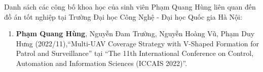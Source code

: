 Danh sách các công bố khoa học của sinh viên Phạm Quang Hùng liên quan đến đồ án tốt nghiệp tại Trường Đại học Công Nghệ - Đại học Quốc gia Hà Nội:
\begin{enumerate}
    \item \textbf{Phạm Quang Hùng}, Nguyễn Đam Trường, Nguyễn Hoàng Vũ, Phạm Duy Hưng (2022/11),``Multi-UAV Coverage Strategy with V-Shaped Formation for Patrol and Surveillance'' tại ``The 11th International Conference on Control, Automation and Information Sciences (ICCAIS 2022)''.
\end{enumerate}
